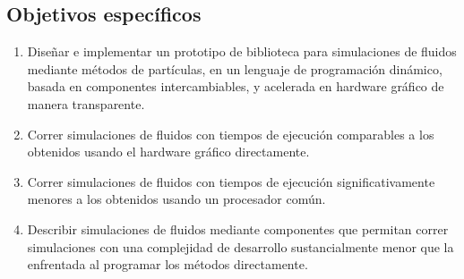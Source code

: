 \documentclass[11pt,spanish]{article}
\begin{document}
\subsection{Objetivos específicos}
\begin{enumerate}
   \item Diseñar e implementar un prototipo de biblioteca
       para simulaciones de fluidos mediante métodos de partículas,
       en un lenguaje de programación dinámico,
       basada en componentes intercambiables,
       y acelerada en hardware gráfico de manera transparente.
   \item Correr simulaciones de fluidos con tiempos de ejecución comparables a los
       obtenidos usando el hardware gráfico directamente.
   \item Correr simulaciones de fluidos con tiempos de ejecución
       significativamente menores
       a los obtenidos usando un procesador común.
   \item Describir simulaciones de fluidos mediante componentes que permitan
       correr simulaciones con una complejidad de desarrollo sustancialmente
       menor que la enfrentada al programar los métodos directamente.
\end{enumerate}

\newpage
\end{document}
